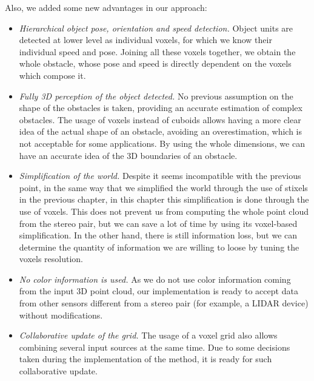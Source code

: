 Also, we added some new advantages in our approach:
\begin{itemize}
 \item \emph{Hierarchical object pose, orientation and speed detection.} Object units are detected at lower level as individual voxels, for which we know their individual speed and pose. Joining all these voxels together, we obtain the whole obstacle, whose pose and speed is directly dependent on the voxels which compose it. 
 \item \emph{Fully 3D perception of the object detected.} No previous assumption on the shape of the obstacles is taken, providing an accurate estimation of complex obstacles. The usage of voxels instead of cuboids allows having a more clear idea of the actual shape of an obstacle, avoiding an overestimation, which is not acceptable for some applications. By using the whole dimensions, we can have an accurate idea of the 3D boundaries of an obstacle.
 \item \emph{Simplification of the world.} Despite it seems incompatible with the previous point, in the same way that we simplified the world through the use of stixels in the previous chapter, in this chapter this simplification is done through the use of voxels. This does not prevent us from computing the whole point cloud from the stereo pair, but we can save a lot of time by using its voxel-based simplification. In the other hand, there is still information loss, but we can determine the quantity of information we are willing to loose by tuning the voxels resolution.
 \item \emph{No color information is used.} As we do not use color information coming from the input 3D point cloud, our implementation is ready to accept data from other sensors different from a stereo pair (for example, a \ac{LIDAR} device) without modifications.
 \item \emph{Collaborative update of the grid.} The usage of a voxel grid also allows combining several input sources at the same time. Due to some decisions taken during the implementation of the method, it is ready for such collaborative update.
\end{itemize}

